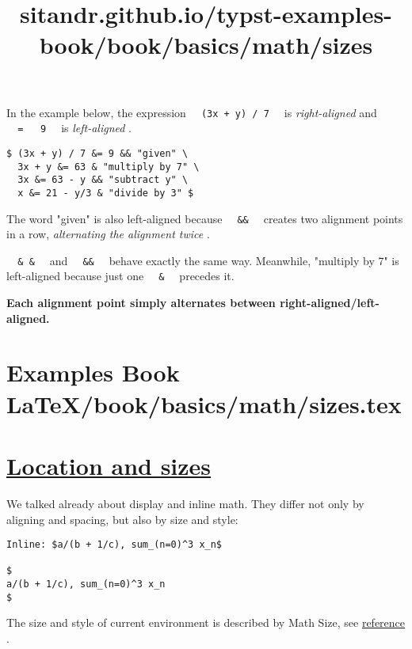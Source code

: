 In the example below, the expression
\texttt{\ }{\texttt{\ (3x\ +\ y)\ /\ 7\ }}\texttt{\ } is
\emph{right-aligned} and
\texttt{\ }{\texttt{\ =\ }}\texttt{\ }{\texttt{\ 9\ }}\texttt{\ } is
\emph{left-aligned} .

\begin{verbatim}
$ (3x + y) / 7 &= 9 && "given" \
  3x + y &= 63 & "multiply by 7" \
  3x &= 63 - y && "subtract y" \
  x &= 21 - y/3 & "divide by 3" $
\end{verbatim}

\pandocbounded{}

The word "given" is also left-aligned because
\texttt{\ }{\texttt{\ \&\&\ }}\texttt{\ } creates two alignment points
in a row, \emph{alternating the alignment twice} .

\texttt{\ }{\texttt{\ \&\ \&\ }}\texttt{\ } and
\texttt{\ }{\texttt{\ \&\&\ }}\texttt{\ } behave exactly the same way.
Meanwhile, "multiply by 7" is left-aligned because just one
\texttt{\ }{\texttt{\ \&\ }}\texttt{\ } precedes it.

\textbf{Each alignment point simply alternates between
right-aligned/left-aligned.}


\section{Examples Book LaTeX/book/basics/math/sizes.tex}
\title{sitandr.github.io/typst-examples-book/book/basics/math/sizes}

\section{\texorpdfstring{\hyperref[location-and-sizes]{Location and
sizes}}{Location and sizes}}\label{location-and-sizes}

We talked already about display and inline math. They differ not only by
aligning and spacing, but also by size and style:

\begin{verbatim}
Inline: $a/(b + 1/c), sum_(n=0)^3 x_n$

$
a/(b + 1/c), sum_(n=0)^3 x_n
$
\end{verbatim}

\pandocbounded{}

The size and style of current environment is described by Math Size, see
\href{https://typst.app/docs/reference/math/sizes}{reference} .

